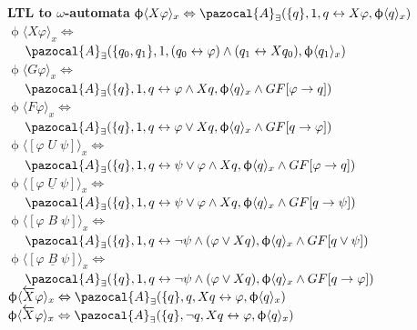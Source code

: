 \documentclass{article}
\newcommand{\Ab}{\pazocal{A}}
\begin{document}
\begin{multicols}{4}
\textbf{LTL to $\omega$-automata}
$\upphi \langle X \varphi\rangle_x \Leftrightarrow \Ab_\exists (\{q\},1,q \leftrightarrow X \varphi, \upphi \langle q \rangle_x)$\\
$\upphi \langle X \varphi\rangle_x \Leftrightarrow $ \\
$\ \ \ \ \Ab_\exists (\{q_0,q_1\},1,(q_0 \leftrightarrow \varphi) \wedge (q_1 \leftrightarrow X q_0), \upphi \langle q_1 \rangle_x)$ \\
$\upphi \langle G \varphi\rangle_x \Leftrightarrow $ \\
$\ \ \ \ \Ab_\exists (\{q\},1,q \leftrightarrow \varphi \wedge X q,\upphi \langle q \rangle_x \wedge GF[\varphi \rightarrow q])$ \\
$\upphi \langle F \varphi\rangle_x \Leftrightarrow$ \\
$\ \ \ \ \Ab_\exists (\{q\},1,q \leftrightarrow \varphi \vee X q, \upphi \langle q \rangle_x \wedge GF[q \rightarrow \varphi])$ \\
$\upphi \langle [\varphi\; U \; \psi] \rangle_x \Leftrightarrow$ \\
$\ \ \ \ \Ab_\exists (\{q\},1,q \leftrightarrow \psi \vee \varphi \wedge X q, \upphi \langle q \rangle_x \wedge GF[\varphi \rightarrow q])$ \\
$\upphi \langle [\varphi\; \underline{U} \; \psi] \rangle_x \Leftrightarrow$ \\
$\ \ \ \ \Ab_\exists (\{q\},1,q \leftrightarrow \psi \vee \varphi \wedge X q, \upphi \langle q \rangle_x \wedge GF[q \rightarrow \psi])$ \\
$\upphi \langle [\varphi\; B \; \psi] \rangle_x \Leftrightarrow$ \\
$\ \ \ \ \Ab_\exists (\{q\},1,q \leftrightarrow \neg\psi \wedge (\varphi \vee X q), \upphi \langle q \rangle_x \wedge GF[q \vee \psi])$ \\
$\upphi \langle [\varphi\; \underline{B} \; \psi] \rangle_x \Leftrightarrow$ \\
$\ \ \ \ \Ab_\exists (\{q\},1,q \leftrightarrow \neg\psi \wedge (\varphi \vee X q), \upphi \langle q \rangle_x \wedge GF[q \rightarrow \varphi])$ \\
$\upphi \langle \overleftarrow{X} \varphi\rangle_x \Leftrightarrow \Ab_\exists (\{q\},q, Xq \leftrightarrow \varphi, \upphi \langle q \rangle_x)$\\
$\upphi \langle \overleftarrow{X} \varphi\rangle_x \Leftrightarrow \Ab_\exists (\{q\},\neg q, Xq \leftrightarrow \varphi, \upphi \langle q \rangle_x)$\\

\end{multicols}
\end{document}
